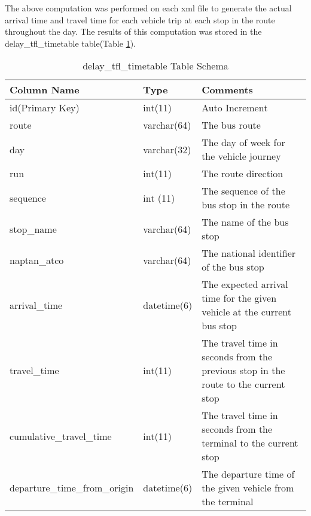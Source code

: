 The above computation was performed on each xml file to generate the actual arrival time and travel time for each vehicle trip at each stop in the route throughout the day. The results of this computation was stored in the delay\_tfl\_timetable table(Table \ref{table:delay_tfl_timetable}).

\begin{table}
\centering
\begin{tabular}{@{}llp{6cm}@{}} \toprule
Column Name & Type & Comments\\ \midrule
id(Primary Key) & int(11)  & Auto Increment\\ [0.4cm]
route & varchar(64) & The bus route \\ [0.4cm]
day & varchar(32) & The day of week for the vehicle journey \\ [0.4cm]
run & int(11) & The route direction \\ [0.4cm]
sequence & int (11) & The sequence of the bus stop in the route \\ [0.4cm]
stop\_name & varchar(64) & The name of the bus stop \\ [0.4cm]
naptan\_atco & varchar(64) & The national identifier of the bus stop \\ [0.4cm]
arrival\_time & datetime(6) & The expected arrival time for the given vehicle at the current bus stop \\ [0.4cm]
travel\_time & int(11) & The travel time in seconds from the previous stop in the route to the current stop \\ [0.4cm]
cumulative\_travel\_time & int(11) & The travel time  in seconds from the terminal to the current stop \\ [0.4cm]
departure\_time\_from\_origin & datetime(6) & The departure time of the given vehicle from the terminal \\
\bottomrule
\end{tabular}
\caption{delay\_tfl\_timetable Table Schema}
\label{table:delay_tfl_timetable}
\end{table}
